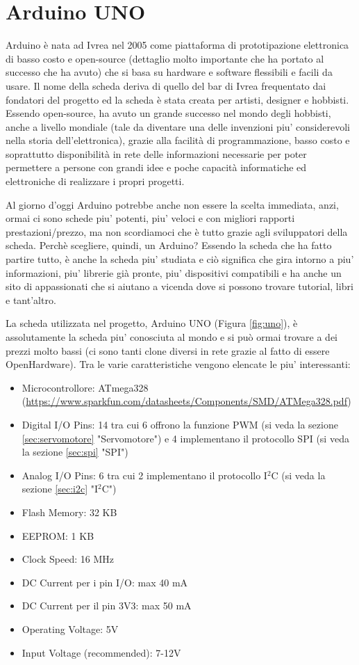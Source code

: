 \documentclass[12pt]{report}
\begin{document}
%
\section{Arduino UNO}
%

Arduino\cite{arduino_storia} è nata ad Ivrea nel 2005 come piattaforma di prototipazione elettronica di basso costo e open-source (dettaglio molto importante che ha portato al successo che ha avuto) che si basa su hardware e software flessibili e facili da usare. Il nome della scheda deriva di quello del bar di Ivrea frequentato dai fondatori del progetto ed la scheda è stata creata per artisti, designer e hobbisti. Essendo open-source, ha avuto un grande successo nel mondo degli hobbisti, anche a livello mondiale (tale da diventare una delle invenzioni piu' considerevoli nella storia dell'elettronica), grazie alla facilità di programmazione, basso costo e soprattutto disponibilità in rete delle informazioni necessarie per poter permettere a persone con grandi idee e poche capacità informatiche ed elettroniche di realizzare i propri progetti. 

Al giorno d'oggi Arduino potrebbe anche non essere la scelta immediata, anzi, ormai ci sono schede piu' potenti, piu' veloci e con migliori rapporti prestazioni/prezzo, ma non scordiamoci che è tutto grazie agli sviluppatori della scheda. Perchè scegliere, quindi, un Arduino? Essendo la scheda che ha fatto partire tutto, è anche la scheda piu' studiata e ciò significa che gira intorno a piu' informazioni, piu' librerie già pronte, piu' dispositivi compatibili e ha anche un sito di appassionati che si aiutano a vicenda dove si possono trovare tutorial, libri e tant'altro.

La scheda utilizzata nel progetto, Arduino UNO (Figura \ref{fig:uno}), è assolutamente la scheda piu' conosciuta al mondo e si può ormai trovare a dei prezzi molto bassi (ci sono tanti clone diversi in rete grazie al fatto di essere OpenHardware). Tra le varie caratteristiche vengono elencate le piu' interessanti:

\begin{itemize}
	\item Microcontrollore: ATmega328 (\url{https://www.sparkfun.com/datasheets/Components/SMD/ATMega328.pdf})
	\item Digital I/O Pins: 14 tra cui 6 offrono la funzione PWM (si veda la sezione \ref{sec:servomotore} "Servomotore") e 4 implementano il protocollo SPI (si veda la sezione \ref{sec:spi} "SPI")
	\item Analog I/O Pins: 6 tra cui 2 implementano il protocollo I$^2$C (si veda la sezione \ref{sec:i2c} "I$^2$C")
	\item Flash Memory: 32 KB
	\item EEPROM: 1 KB
	\item Clock Speed: 16 MHz
	\item DC Current per i pin I/O: max 40 mA
	\item DC Current per il pin 3V3: max 50 mA
	\item Operating Voltage: 5V
	\item Input Voltage (recommended): 7-12V
\end{itemize}
\end{document}
